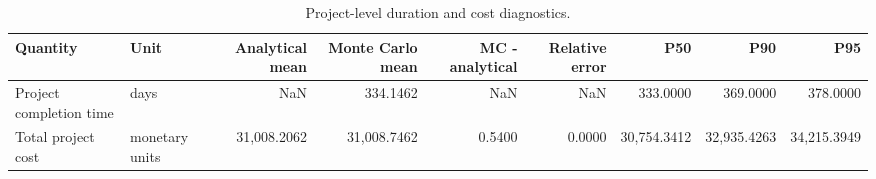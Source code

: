 \begin{table}
\caption{Project-level duration and cost diagnostics.}
\label{tab:project-level-duration-cost-check}
\begin{tabular}{llrrrrrrr}
\toprule
Quantity & Unit & Analytical mean & Monte Carlo mean & MC - analytical & Relative error & P50 & P90 & P95 \\
\midrule
Project completion time & days & NaN & 334.1462 & NaN & NaN & 333.0000 & 369.0000 & 378.0000 \\
Total project cost & monetary units & 31,008.2062 & 31,008.7462 & 0.5400 & 0.0000 & 30,754.3412 & 32,935.4263 & 34,215.3949 \\
\bottomrule
\end{tabular}
\end{table}
